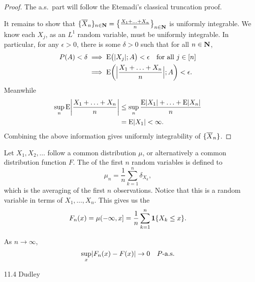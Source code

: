 \begin{proof}
    The a.s.\ part will follow the Etemadi's classical truncation proof.

    It remains to show that $\{\overline{X}_n\}_{n\in \mathbf{N}} = \bigl\{\frac{X_1 + \dotsc + X_n}{n}\bigr\}_{n\in \mathbf{N}}$ is uniformly integrable. We know each $X_j$, as an $L^1$ random variable, must be uniformly integrable. In particular, for any $\epsilon > 0$, there is some $\delta > 0$ such that for all $n\in \mathbf{N}$, \begin{align*}
    P(A) < \delta & \implies \mathop{}\!\mathrm{E} \bigl(\lvert X_j \rvert;A\bigr) < \epsilon \quad\text{for all } j \in [n] \\ & \implies \mathop{}\!\mathrm{E} \biggl(\Bigl\vert\frac{X_1 + \dotsc +X_n}{n}\Bigr\vert;A\biggr) < \epsilon.
\end{align*}
Meanwhile \begin{align*}
    \sup_n \mathop{}\!\mathrm{E} \biggl\vert\frac{X_1 + \dotsc +X_n}{n}\biggr\vert & \leq \sup_n \frac{\mathop{}\!\mathrm{E} \lvert X_1 \rvert + \dotsc + \mathop{}\!\mathrm{E}\lvert X_n \rvert}{n} \\ 
    & = \mathop{}\!\mathrm{E} \lvert X_1 \rvert < \infty.
\end{align*}
Combining the above information gives uniformly integrability of $\{\overline{X}_n\}$.
\end{proof}

\begin{namedthm}
    
\end{namedthm}

\begin{namedthm}
    
\end{namedthm}

Let $X_1,X_2,\dotsc$ follow a common distribution $\mu$, or alternatively a common distribution function $F$. The  of the first $n$ random variables is defined to \[
    \mu_n = \frac{1}{n} \sum_{k = 1}^n \delta_{X_k},
\] which is the averaging of the first $n$ observations. Notice that this is a random variable in terms of $X_1,\dotsc,X_n$. This gives us the  \[
    F_n(x) = \mu(-\infty,x] = \frac{1}{n} \sum_{k=1}^n \mathbf{1}\{X_k \leq x\}.
\]

\begin{namedthm}
    As $n \to \infty$, \[
        \sup_{x} \lvert F_n(x) - F(x) \rvert \to 0 \quad P\text{-a.s.}
    \]
\end{namedthm}

11.4 Dudley

